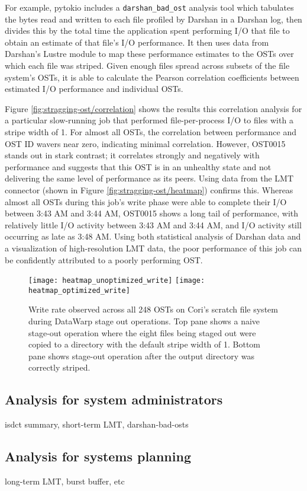 For example, pytokio includes a \texttt{darshan\_bad\_ost} analysis tool which tabulates the bytes read and written to each file profiled by Darshan in a Darshan log, then divides this by the total time the application spent performing I/O that file to obtain an estimate of that file's I/O performance.
It then uses data from Darshan's Lustre module to map these performance estimates to the OSTs over which each file was striped.
Given enough files spread across subsets of the file system's OSTs, it is able to calculate the Pearson correlation coefficients between estimated I/O performance and individual OSTs.

Figure \ref{fig:stragging-ost/correlation} shows the results this correlation analysis for a particular slow-running job that performed file-per-process I/O to files with a stripe width of 1.
For almost all OSTs, the correlation between performance and OST ID wavers near zero, indicating minimal correlation.
However, OST0015 stands out in stark contrast; it correlates strongly and negatively with performance and suggests that this OST is in an unhealthy state and not delivering the same level of performance as its peers.
Using data from the LMT connector (shown in Figure \ref{fig:stragging-ost/heatmap}) confirms this.
Whereas almost all OSTs during this job's write phase were able to complete their I/O between 3:43 AM and 3:44 AM, OST0015 shows a long tail of performance, with relatively little I/O activity between 3:43 AM and 3:44 AM, and I/O activity still occurring as late as 3:48 AM.
Using both statistical analysis of Darshan data and a visualization of high-resolution LMT data, the poor performance of this job can be confidently attributed to a poorly performing OST.

\begin{figure}
    \centering
    \texttt{[image: heatmap\_unoptimized\_write]}
    \texttt{[image: heatmap\_optimized\_write]}
    \caption{Write rate observed across all 248 OSTs on Cori's scratch file system during DataWarp stage out operations.
    Top pane shows a naive stage-out operation where the eight files being staged out were copied to a directory with the default stripe width of 1.
    Bottom pane shows stage-out operation after the output directory was correctly striped.}
    \label{fig:stageout-unopt}
    \vspace{-.2in}
\end{figure}

\subsection{Analysis for system administrators} \label{sec:results/admins}

isdct summary, short-term LMT, darshan-bad-osts

\subsection{Analysis for systems planning} \label{sec:results/planning}

long-term LMT, burst buffer, etc

